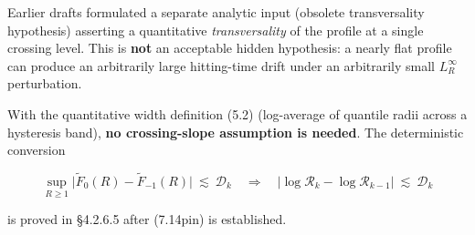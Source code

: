 \documentclass[
  11pt,
]{article}
\begin{document}
Earlier drafts formulated a separate analytic input (obsolete transversality hypothesis) asserting a quantitative \emph{transversality} of the profile at a single crossing level. This is \textbf{not} an acceptable hidden hypothesis: a nearly flat profile can produce an arbitrarily large hitting-time drift under an arbitrarily small \(L^\infty_R\) perturbation.

With the quantitative width definition (5.2) (log-average of quantile radii across a hysteresis band), \textbf{no crossing-slope assumption is needed}. The deterministic conversion

\begin{equation}
\sup_{R\ge 1}\big|\widetilde F_0(R)-\widetilde F_{-1}(R)\big|\ \lesssim\ \mathcal D_k
\quad\Longrightarrow\quad
\big|\log\mathcal R_k-\log\mathcal R_{k-1}\big|\ \lesssim\ \mathcal D_k
\tag{M2b}
\end{equation}

is proved in §4.2.6.5 after (7.14pin) is established.
\end{document}
